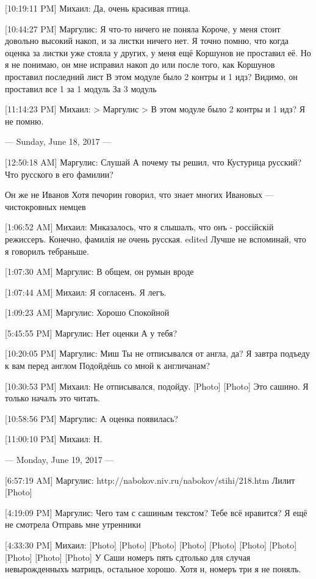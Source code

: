 \documentclass{article}
\newcommand{\yat}{{\fontencoding{X2}\selectfont\cyryat}} %
\begin{document}
[10:19:11 PM] Михаил:
Да, очень красивая птица.

[10:44:27 PM] Маргулис:
Я что-то ничего не поняла
 Короче, у меня стоит довольно высокий накоп, и за листки ничего нет. Я точно помню, что когда оценка за листки уже стояла у других, у меня ещё Коршунов не проставил её. Но я не понимаю, он мне исправил накоп до или после того, как Коршунов проставил последний лист
 В этом модуле было 2 контры и 1 идз?
 Видимо, он проставил все 1 за 1 модуль
 За 3 модуль

[11:14:23 PM] Михаил:
> Маргулис
> В этом модуле было 2 контры и 1 идз?
Я не помню.

--- Sunday, June 18, 2017 ---

[12:50:18 AM] Маргулис:
Слушай
 А почему ты решил, что Кустурица русский? Что русского в его фамилии? 
 
 
 
 
 
 
 
Он же не Иванов
 Хотя печорин говорил, что знает многих Ивановых — чистокровных немцев

[1:06:52 AM] Михаил:
Мн\yat казалось, что я слышалъ, что онъ - россійскій режиссеръ. Конечно, фамилія не очень русская.
edited 
Лучше не вспоминай, что я говорилъ теб\yat раньше.

[1:07:30 AM] Маргулис:
В общем, он румын вроде

[1:07:44 AM] Михаил:
Я согласенъ.
 Я легъ.

[1:09:23 AM] Маргулис:
Хорошо
 Спокойной

[5:45:55 PM] Маргулис:
Нет оценки
 А у тебя?

[10:20:05 PM] Маргулис:
Миш
 Ты не отписывался от англа, да?
 Я завтра подъеду к вам перед англом
 Подойдёшь со мной к англичанам?

[10:30:53 PM] Михаил:
Не отписывался, подойду.
 [Photo]
 [Photo]
 Это сашино. Я только началъ это читать.

[10:58:56 PM] Маргулис:
А оценка появилась?

[11:00:10 PM] Михаил:
Н.

--- Monday, June 19, 2017 ---

[6:57:19 AM] Маргулис:
http://nabokov.niv.ru/nabokov/stihi/218.htm
Лилит
[Photo]

[4:19:09 PM] Маргулис:
Чего там с сашиным текстом? Тебе всё нравится? Я ещё не смотрела
 Отправь мне утренники

[4:33:30 PM] Михаил:
[Photo]
 [Photo]
 [Photo]
 [Photo]
 [Photo]
 [Photo]
 [Photo]
 [Photo]
 [Photo]
 [Photo]
 У Саши номеръ пять сд только для случая невырожденныхъ матрицъ, остальное хорошо.
 Хотя н, номеръ три я не понялъ.
\end{document}

